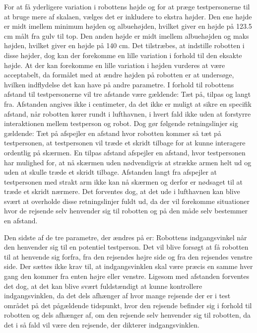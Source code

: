 For at få yderligere variation i robottens højde og for at præge testpersonerne til at bruge mere af skalaen, vælges det er inkludere to ekstra højder. Den ene højde er midt imellem minimum højden og albuehøjden, hvilket giver en højde på 123.5 cm målt fra gulv til top. Den anden højde er midt imellem albuehøjden og maks højden, hvilket giver en højde på 140 cm. Det tilstræbes, at indstille robotten i disse højder, dog kan der forekomme en lille variation i forhold til den eksakte højde. At der kan forekomme en lille variation i højden vurderes at være acceptabelt, da formålet med at ændre højden på robotten er at undersøge, hvilken indflydelse det kan have på andre parametre.\blankline           
%
I forhold til robottens afstand til testpersonerne vil tre afstande være gældende: Tæt på, tilpas og langt fra. Afstanden angives ikke i centimeter, da det ikke er muligt at sikre en specifik afstand, når robotten kører rundt i lufthavnen, i hvert fald ikke uden at forstyrre interaktionen mellem testperson og robot. Dog gør følgende retningslinjer sig gældende: Tæt på afspejler en afstand hvor robotten kommer så tæt på testpersonen, at testpersonen vil træde et skridt tilbage for at kunne interagere ordentlig på skærmen. En tilpas afstand afspejler en afstand, hvor testpersonen har mulighed for, at nå skærmen uden nødvendigvis at strække armen helt ud og uden at skulle træde et skridt tilbage. Afstanden langt fra afspejler at testpersonen med strakt arm ikke kan nå skærmen og derfor er nødsaget til at træde et skridt nærmere. Det forventes dog, at det ude i lufthavnen kan blive svært at overholde disse retningslinjer fuldt ud, da der vil forekomme situationer hvor de rejsende selv henvender sig til robotten og på den måde selv bestemmer en afstand. 

Den sidste af de tre parametre, der ændres på er: Robottens indgangsvinkel når den henvender sig til en potentiel testperson. Det vil blive forsøgt at få robotten til at henvende sig forfra, fra den rejsendes højre side og fra den rejsendes venstre side. Der sættes ikke krav til, at indgangsvinklen skal være præcis en samme hver gang den kommer fra enten højre eller venstre. Ligesom med afstanden forventes det dog, at det kan blive svært fuldstændigt at kunne kontrollere indgangsvinklen, da det dels afhænger af hvor mange rejsende der er i test området på det pågældende tidspunkt, hvor den rejsende befinder sig i forhold til robotten og dels afhænger af, om den rejsende selv henvender sig til robotten, da det i så fald vil være den rejsende, der dikterer indgangsvinklen.     


